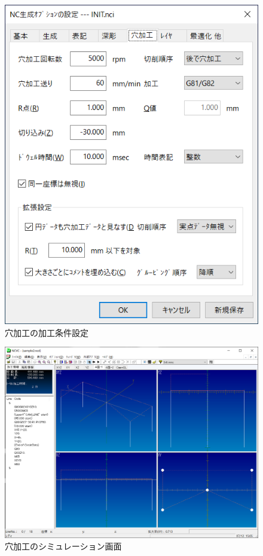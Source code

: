 \begin{minipage}{0.5\textwidth}
\begin{figure}[H]
\centering
\includegraphics[scale=0.7]{No2/fig/hole.png}
\caption{穴加工の加工条件設定}
\label{fig:hole.png}
\end{figure}
\end{minipage}

\begin{figure}[H]
\centering
\includegraphics[scale=0.55]{No2/fig/sample02.png}
\caption{穴加工のシミュレーション画面}
\label{fig:sample2.png}
\end{figure}
